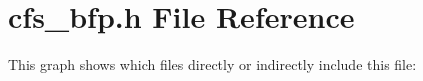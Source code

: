 \section{cfs\_\-bfp.h File Reference}
\label{cfs__bfp_8h}




This graph shows which files directly or indirectly include this file: